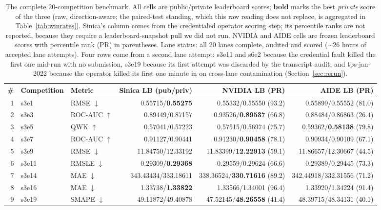 \documentclass[11pt,a4paper]{article}
\newcommand{\dn}{\ensuremath{\downarrow}}
\newcommand{\up}{\ensuremath{\uparrow}}
\begin{document}
\begin{table}[htbp]
\centering\footnotesize
\setlength{\tabcolsep}{3pt}
\caption{The complete 20-competition benchmark. All cells are
public/private leaderboard scores; \textbf{bold} marks the best \emph{private} score of the
three (raw, direction-aware; the paired-test standing, which this raw reading does not
replace, is aggregated in Table~\ref{tab:winrates}). Sinica's column comes from the credentialed
operator scoring step; its percentile ranks are not reported, because they require a
leaderboard-snapshot pull we did not run. NVIDIA and AIDE cells are frozen leaderboard scores with percentile rank (PR) in
parentheses. Lane status: all 20 lanes complete, audited and scored (${\sim}26$ hours of accepted
lane attempts). Four rows come from a second lane attempt: s3e11 and s6e2 because the credential
fault killed the first one mid-run with no submission, s3e19 because its first attempt was
discarded by the transcript audit, and tps-jan-2022 because the operator killed its first one
minute in on cross-lane contamination (Section~\ref{sec:rerun}).}
\label{tab:bench}
\begin{tabular}{@{}rllrrr@{}}
\toprule
\# & \textbf{Competition} & \textbf{Metric} & \textbf{Sinica LB (pub/priv)} & \textbf{NVIDIA LB (PR)} & \textbf{AIDE LB (PR)} \\
\midrule
1 & s3e1 & RMSE \dn & 0.55715/\textbf{0.55275} & 0.55332/0.55550 (93.2) & 0.55899/0.55552 (81.0) \\
2 & s3e3 & ROC-AUC \up & 0.89449/0.87157 & 0.93526/\textbf{0.89537} (66.8) & 0.88484/0.86863 (26.4) \\
3 & s3e5 & QWK \up & 0.57041/0.57223 & 0.57515/0.56974 (75.7) & 0.59362/\textbf{0.58138} (79.8) \\
4 & s3e7 & ROC-AUC \up & 0.91127/0.90441 & 0.91230/\textbf{0.90458} (78.1) & 0.90934/0.90109 (67.1) \\
5 & s3e9 & RMSE \dn & 11.84750/12.33192 & 11.83399/\textbf{12.22913} (59.1) & 11.86657/12.30667 (44.5) \\
6 & s3e11 & RMSLE \dn & 0.29309/\textbf{0.29368} & 0.29559/0.29624 (66.6) & 0.29389/0.29445 (73.3) \\
7 & s3e14 & MAE \dn & 343.43434/333.18611 & 338.36524/\textbf{330.71616} (89.2) & 342.44918/332.31556 (71.2) \\
8 & s3e16 & MAE \dn & 1.33738/\textbf{1.33822} & 1.33566/1.34001 (96.4) & 1.33920/1.34224 (91.4) \\
9 & s3e19 & SMAPE \dn & 49.11872/49.40878 & 47.52145/\textbf{48.26558} (41.4) & 48.39715/48.34131 (40.1) \\

\end{tabular}
\end{table}
\end{document}
